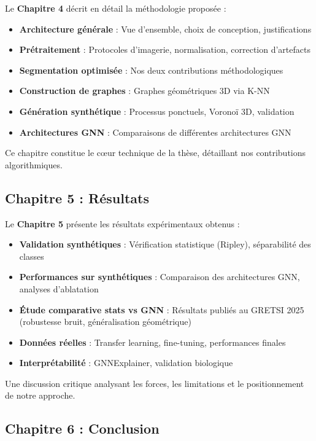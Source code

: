 Le \textbf{Chapitre 4} décrit en détail la méthodologie proposée :
\begin{itemize}
    \item \textbf{Architecture générale} : Vue d'ensemble, choix de conception, justifications
    \item \textbf{Prétraitement} : Protocoles d'imagerie, normalisation, correction d'artefacts
    \item \textbf{Segmentation optimisée} : Nos deux contributions méthodologiques
    \item \textbf{Construction de graphes} : Graphes géométriques 3D via K-NN
    \item \textbf{Génération synthétique} : Processus ponctuels, Voronoï 3D, validation
    \item \textbf{Architectures GNN} : Comparaisons de différentes architectures GNN
\end{itemize}

Ce chapitre constitue le cœur technique de la thèse, détaillant nos contributions algorithmiques.

\subsection{Chapitre 5 : Résultats}

Le \textbf{Chapitre 5} présente les résultats expérimentaux obtenus :
\begin{itemize}
    \item \textbf{Validation synthétiques} : Vérification statistique (Ripley), séparabilité des classes
    \item \textbf{Performances sur synthétiques} : Comparaison des architectures GNN, analyses d'ablatation
    \item \textbf{Étude comparative stats vs GNN} : Résultats publiés au GRETSI 2025 (robustesse bruit, généralisation géométrique)
    \item \textbf{Données réelles} : Transfer learning, fine-tuning, performances finales
    \item \textbf{Interprétabilité} : GNNExplainer, validation biologique
\end{itemize}

Une discussion critique analysant les forces, les limitations et le positionnement de notre approche.

\subsection{Chapitre 6 : Conclusion}

